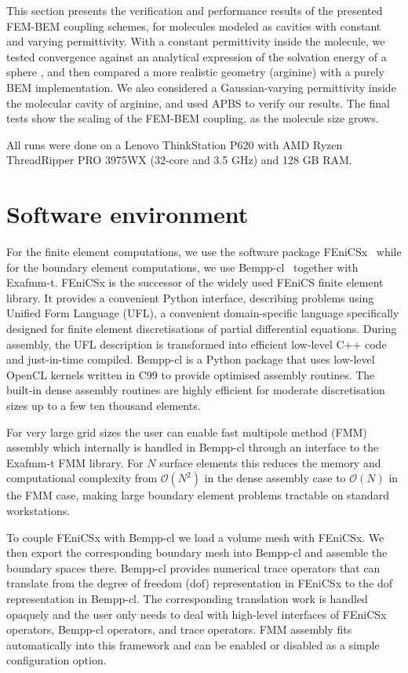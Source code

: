 This section presents the verification and performance results of the presented FEM-BEM coupling schemes, for molecules modeled as cavities with constant and varying permittivity.
With a constant permittivity inside the molecule, we tested convergence against an analytical expression of the solvation energy of a sphere \cite{Kirkwood1934}, and then compared a more realistic geometry (arginine) with a purely BEM implementation.
We also considered a Gaussian-varying permittivity\cite{grant2001smooth,li2013dielectric} inside the molecular cavity of arginine, and used APBS \cite{BakerETal2001} to verify our results.
The final tests show the scaling of the FEM-BEM coupling, as the molecule size grows. 

All runs were done on a Lenovo ThinkStation P620 with AMD Ryzen ThreadRipper PRO 3975WX (32-core and 3.5 GHz) and 128 GB RAM. 

\section*{\sffamily \Large Software environment}

For the finite element computations, we use the software package FEniCSx~\cite{BasixJoss} while for the boundary element computations, we use Bempp-cl~\cite{BetckeScroggs2021} together with Exafmm-t. FEniCSx is the successor of the widely used FEniCS finite element library.
It provides a convenient Python interface, describing problems using Unified Form Language (UFL), a convenient domain-specific language specifically designed for finite element discretisations of partial differential equations. During assembly, the UFL description is transformed into efficient low-level C++ code and just-in-time compiled. Bempp-cl is a Python package that uses low-level OpenCL kernels written in C99 to provide optimised assembly routines. The built-in dense assembly routines are highly efficient for moderate discretisation sizes up to a few ten thousand elements.

For very large grid sizes the user can enable fast multipole method (FMM) assembly which internally is handled in Bempp-cl through an interface to the Exafmm-t FMM library. For $N$ surface elements this reduces the memory and computational complexity from $\mathcal{O}(N^2)$ in the dense assembly case to $\mathcal{O}(N)$ in the FMM case, making large boundary element problems tractable on standard workstations.

To couple FEniCSx with Bempp-cl we load a volume mesh with FEniCSx. We then export the corresponding boundary mesh into Bempp-cl and assemble the boundary spaces there. Bempp-cl provides numerical trace operators that can translate from the degree of freedom (dof) representation in FEniCSx to the dof representation in Bempp-cl. The corresponding translation work is handled opaquely and the user only needs to deal with high-level interfaces of FEniCSx operators, Bempp-cl operators, and trace operators. FMM assembly fits automatically into this framework and can be enabled or disabled as a simple configuration option.

